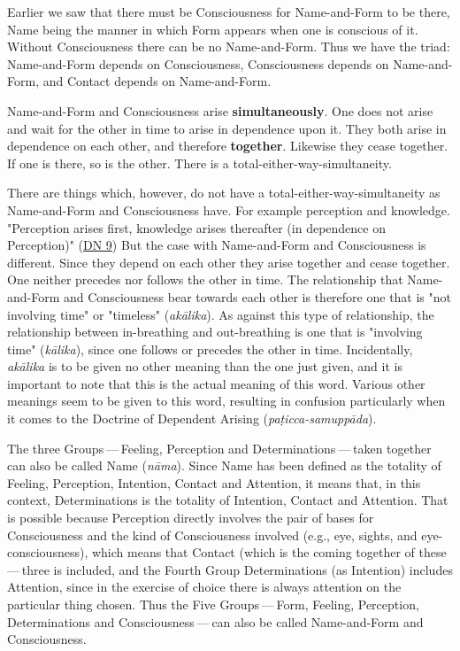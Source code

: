 Earlier we saw that there must be Consciousness for Name-and-Form to be
there, Name being the manner in which Form appears when one is conscious
of it. Without Consciousness there can be no Name-and-Form. Thus we have
the triad: Name-and-Form depends on Consciousness, Consciousness depends
on Name-and-Form, and Contact depends on Name-and-Form.


Name-and-Form and Consciousness arise \textbf{simultaneously}. One does not
arise and wait for the other in time to arise in dependence upon it.
They both arise in dependence on each other, and therefore \textbf{together}.
Likewise they cease together. If one is there, so is the other. There is
a total-either-way-simultaneity.


There are things which, however, do not have a
total-either-way-simultaneity as Name-and-Form and Consciousness have.
For example perception and knowledge. "Perception arises first,
knowledge arises thereafter (in dependence on
Perception)" (\href{https://suttacentral.net/dn9/en/thanissaro}{DN 9}) But the case with Name-and-Form
and Consciousness is different. Since they depend on each other they
arise together and cease together. One neither precedes nor follows the
other in time. The relationship that Name-and-Form and Consciousness
bear towards each other is therefore one that is "not involving time" or
"timeless" (\emph{akālika}). As against this type of relationship, the
relationship between in-breathing and out-breathing is one that is
"involving time" (\emph{kālika}), since one follows or precedes the other
in time. Incidentally, \emph{akālika} is to be given no other meaning than the
one just given, and it is important to note that this is the actual
meaning of this word. Various other meanings seem to be given to this
word, resulting in confusion particularly when it comes to the Doctrine
of Dependent Arising (\emph{paṭicca-samuppāda}).


The three Groups — Feeling, Perception and Determinations — taken
together can also be called Name (\emph{nāma}). Since Name has been defined
as the totality of Feeling, Perception, Intention, Contact and
Attention, it means that, in this context, Determinations is the
totality of Intention, Contact and Attention. That is possible because
Perception directly involves the pair of bases for Consciousness and the
kind of Consciousness involved (e.g., eye, sights, and
eye-consciousness), which means that Contact (which is the coming
together of these — three is included, and the Fourth Group
Determinations (as Intention) includes Attention, since in the exercise
of choice there is always attention on the particular thing chosen. Thus
the Five Groups — Form, Feeling, Perception, Determinations and
Consciousness — can also be called Name-and-Form and Consciousness.


